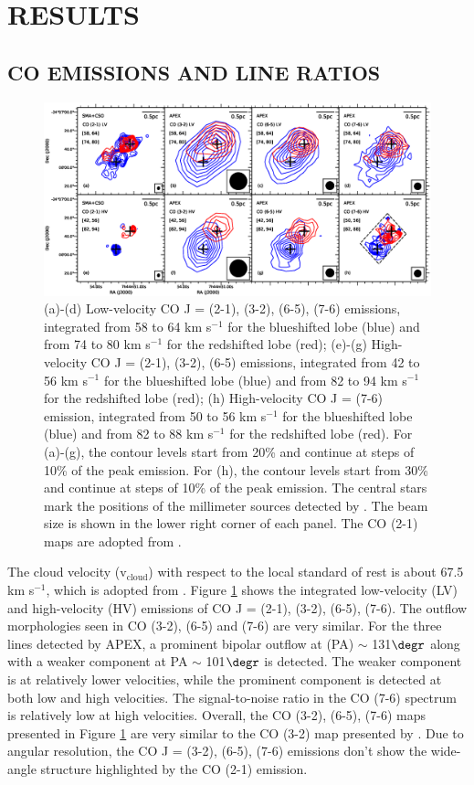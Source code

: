 \section{RESULTS}
\subsection{CO EMISSIONS AND LINE RATIOS}

\begin{figure}[htbp]
\includegraphics[scale=.60]{./fig/ori_contourall.eps}
\caption{(a)-(d) Low-velocity CO J = (2-1), (3-2), (6-5), (7-6) emissions, integrated from 58 to 64 km s$^{-1} $ for the blueshifted lobe (blue) and from 74 to 80 km s$^{-1}$ for the redshifted lobe (red); (e)-(g) High-velocity CO J = (2-1), (3-2), (6-5) emissions,  integrated from 42 to 56 km s$^{-1} $ for the blueshifted lobe (blue) and from 82 to 94 km s$^{-1}$ for the redshifted lobe (red); (h) High-velocity CO J = (7-6) emission, integrated from 50 to 56 km s$^{-1} $ for the blueshifted lobe (blue) and from 82 to 88 km s$^{-1}$ for the redshifted lobe (red). For (a)-(g), the contour levels start from 20\% and continue at steps of 10\% of the peak emission. For (h), the contour levels start from 30\% and continue at steps of 10\% of the peak emission. The central stars mark the positions of the millimeter sources detected by \citet{2009ApJ...696...66Q}. The beam size is shown in the lower right corner of each panel. The CO (2-1) maps are adopted from \citet{2009ApJ...696...66Q}. \label{fig1}}
\end{figure}

The cloud velocity (v$_{\mathrm{cloud}}$) with respect to the local standard of rest is about 67.5 km s$^{-1}$, which is adopted from \citet{2003A&A...412..175K}. Figure \ref{fig1} shows the integrated low-velocity (LV) and high-velocity (HV) emissions of CO J = (2-1), (3-2), (6-5), (7-6). The outflow morphologies seen in CO (3-2), (6-5) and (7-6) are very similar. For the three lines detected by APEX, a prominent bipolar outflow at (PA) $\sim$ 131${\degr}$ along with a weaker component at PA $\sim$ 101${\degr}$ is detected. The weaker component is at relatively lower velocities, while the prominent component is detected at both low and high velocities. The signal-to-noise ratio in the CO (7-6) spectrum is relatively low at high velocities. Overall, the CO (3-2), (6-5), (7-6) maps presented in Figure \ref{fig1} are very similar to the CO (3-2) map presented by \citet{2003A&A...412..175K}. Due to angular resolution, the CO J = (3-2), (6-5), (7-6) emissions don't show the wide-angle structure highlighted by the CO (2-1) emission.

